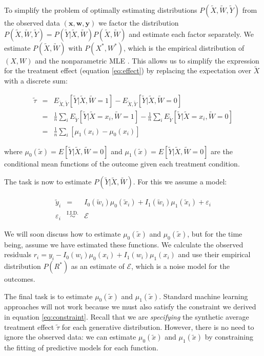 To simplify the problem of optimally estimating distributions $P(\tilde X, \tilde W, \tilde Y)$ from the observed data $(\mathbf{x}, \mathbf{w}, \mathbf{y})$ we factor the distribution $P(\tilde X, \tilde W, \tilde Y) = P(\tilde Y | \tilde X, \tilde W)P(\tilde X, \tilde W)$ and estimate each factor separately. We estimate $P(\tilde X, \tilde W)$ with $P(X^*, W^*)$, which is the empirical distribution of $(X,W)$ and the nonparametric MLE \cite{Efron:1993dc}. This allows us to simplify the expression for the treatment effect (equation \ref{eq:effect}) by replacing the expectation over $\tilde X$ with a discrete sum:

\begin{equation}
\begin{array}{rcl}
\tilde \tau & = & E_{\tilde X, \tilde Y}[ \tilde Y| \tilde X, \tilde W=1]  - E_{\tilde X,\tilde Y}[\tilde Y| \tilde X, \tilde W=0] \\
& = & \frac{1}{n}\sum_iE_{\tilde Y}[ \tilde Y| \tilde X=x_i, \tilde W=1]  - \frac{1}{n}\sum_i E_{\tilde Y}[\tilde Y| \tilde X=x_i, \tilde W=0] \\
& = & \frac{1}{n}\sum_i[\mu_1(x_i) - \mu_0(x_i)]
\end{array}
\label{eq:constraint}
\end{equation}

where $\mu_0(\tilde x) = E[\tilde{Y}|\tilde X, \tilde W=0]$ and $\mu_1(\tilde x)=E[\tilde{Y}|\tilde X, \tilde W=0]$ are the conditional mean functions of the outcome given each treatment condition. 

The task is now to estimate $P(\tilde Y | \tilde X, \tilde W)$. For this we assume a model: 

\begin{equation}
\begin{array}{rcl}
\tilde y_i & = & I_0(\tilde w_i)\mu_0(\tilde x_i) + I_1(\tilde w_i)\mu_1(\tilde x_i)+ \varepsilon_i \\
\varepsilon_i & \overset{\text{I.I.D.}}{\sim} & \mathcal{E}
\end{array}
\end{equation}

We will soon discuss how to estimate $\mu_0(\tilde x)$ and $\mu_0(\tilde x)$, but for the time being, assume we have estimated these functions. We calculate the observed residuals $r_i = y_i - I_0(w_i)\mu_0(x_i) + I_1(w_i)\mu_1(x_i)$ and use their empirical distribution $P(R^*)$ as an estimate of $\mathcal{E}$, which is a noise model for the outcomes.

The final task is to estimate $\mu_0(\tilde x)$ and $\mu_1(\tilde x)$. Standard machine learning approaches will not work because we must also satisfy the constraint we derived in equation \ref{eq:constraint}. Recall that we are \emph{specifying} the synthetic average treatment effect $\tilde \tau$ for each generative distribution. However, there is no need to ignore the observed data: we can estimate $\mu_0(\tilde x)$ and $\mu_1(\tilde x)$ by constraining the fitting of predictive models for each function. 

